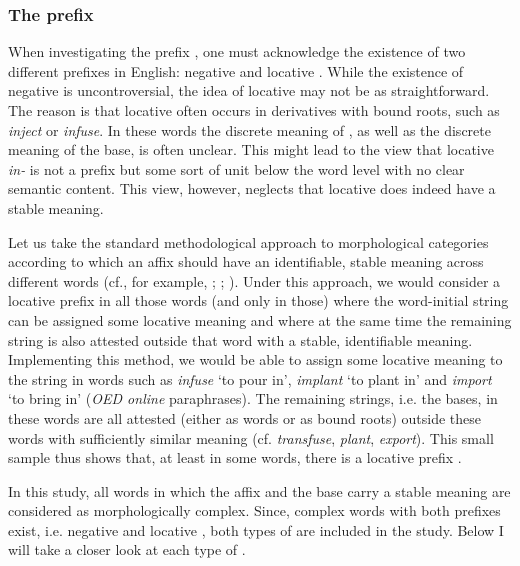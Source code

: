 \subsubsection{The prefix } \label{theory:in}

When investigating the prefix , one must acknowledge the existence of two different prefixes in English: negative  and locative . While the existence of negative  is uncontroversial, the idea of locative  may not be as straightforward. The reason is that locative  often occurs in derivatives with bound roots, such as \textit{inject} or \textit{infuse}. In these words the discrete meaning of , as well as the discrete meaning of the base, is often unclear. This might lead to the view that locative \textit{in-} is not a prefix but some sort of unit below the word level with  no clear semantic content. This view, however, neglects that locative  does indeed have a stable meaning.  

Let us take the standard methodological approach to morphological categories according to which an affix should have an identifiable, stable meaning across different words (cf., for example, \citealt[chapter 5.2.2]{Plag.1999}; \citealt[63 ff]{Stockwell.2001}; \citealt[68]{Schulte.2015}). Under this approach, we would consider  a locative prefix in all those words (and only in those) where the word-initial string  can be assigned some locative meaning and where at the same time the remaining string is also attested outside that word with a stable, identifiable meaning.
Implementing this method, we would be able to assign some locative meaning to the string  in words such as \textit{infuse} `to pour in', \textit{implant} `to plant in' and \textit{import} `to bring in' (\textit{OED online} paraphrases). The remaining strings, i.e. the bases, in these words are all attested (either as words or as bound roots) outside these words with sufficiently similar meaning (cf. \textit{transfuse}, \textit{plant}, \textit{export}). This small sample thus shows that, at least in some words, there is a locative prefix . 


In this study, all words in which the affix and the base carry a stable meaning are considered as morphologically complex.  Since, complex words with both prefixes exist, i.e. negative and locative , both types of  are included in the study.  Below I will take a closer look at each type of .




